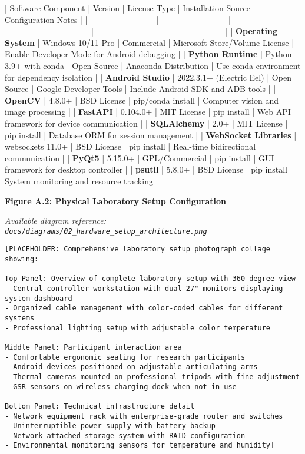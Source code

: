 \documentclass[12pt,a4paper]{article}
\begin{document}
| Software Component      | Version                  | License Type   | Installation Source            | Configuration Notes                            |
|-------------------------|--------------------------|----------------|--------------------------------|------------------------------------------------|
| \textbf{Operating System}    | Windows 10/11 Pro        | Commercial     | Microsoft Store/Volume License | Enable Developer Mode for Android debugging    |
| \textbf{Python Runtime}      | Python 3.9+ with conda   | Open Source    | Anaconda Distribution          | Use conda environment for dependency isolation |
| \textbf{Android Studio}      | 2022.3.1+ (Electric Eel) | Open Source    | Google Developer Tools         | Include Android SDK and ADB tools              |
| \textbf{OpenCV}              | 4.8.0+                   | BSD License    | pip/conda install              | Computer vision and image processing           |
| \textbf{FastAPI}             | 0.104.0+                 | MIT License    | pip install                    | Web API framework for device communication     |
| \textbf{SQLAlchemy}          | 2.0+                     | MIT License    | pip install                    | Database ORM for session management            |
| \textbf{WebSocket Libraries} | websockets 11.0+         | BSD License    | pip install                    | Real-time bidirectional communication          |
| \textbf{PyQt5}               | 5.15.0+                  | GPL/Commercial | pip install                    | GUI framework for desktop controller           |
| \textbf{psutil}              | 5.8.0+                   | BSD License    | pip install                    | System monitoring and resource tracking        |

\textbf{Figure A.2: Physical Laboratory Setup Configuration}

\textit{Available diagram reference: \texttt{docs/diagrams/02\_hardware\_setup\_architecture.png}}

\begin{verbatim}
[PLACEHOLDER: Comprehensive laboratory setup photograph collage showing:

Top Panel: Overview of complete laboratory setup with 360-degree view
- Central controller workstation with dual 27" monitors displaying system dashboard
- Organized cable management with color-coded cables for different systems
- Professional lighting setup with adjustable color temperature

Middle Panel: Participant interaction area
- Comfortable ergonomic seating for research participants
- Android devices positioned on adjustable articulating arms
- Thermal cameras mounted on professional tripods with fine adjustment
- GSR sensors on wireless charging dock when not in use

Bottom Panel: Technical infrastructure detail
- Network equipment rack with enterprise-grade router and switches
- Uninterruptible power supply with battery backup
- Network-attached storage system with RAID configuration
- Environmental monitoring sensors for temperature and humidity]
\end{verbatim}
\end{document}
